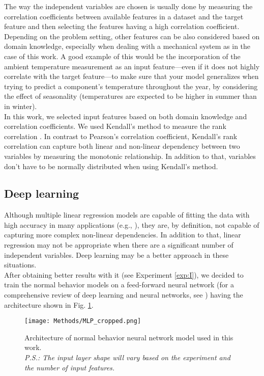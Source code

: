  \par The way the independent variables are chosen is usually done by measuring the correlation coefficients between available features in a
  dataset and the target feature and then selecting the features having a high correlation coefficient. Depending on the problem setting, other features can be also considered 
  based on domain knowledge, especially when dealing with a mechanical system as in the case of this work. A good example of this would be the incorporation of 
  the ambient temperature measurement as an input feature---even if it does not highly correlate with the target feature---to make sure that your model generalizes when 
  trying to predict a component's temperature throughout the year, by considering the effect of seasonality 
  (temperatures are expected to be higher in summer than in winter).\\
  In this work, we selected input features based on both domain knowledge and correlation coefficients. We used Kendall's method to measure the rank correlation \cite{Kendall}.
  In contrast to Pearson's correlation coefficient, Kendall's rank correlation can capture both linear and non-linear dependency between two variables by 
  measuring the monotonic relationship. In addition to that, variables don't have to be normally distributed when using Kendall's method.

\subsection{Deep learning}
  Although multiple linear regression models are capable of fitting the data with high accuracy in many applications (e.g., \cite{Linear_Regression_Example_1}), they are,
  by definition, not capable of capturing more complex non-linear dependencies. In addition to that, linear regression may not be appropriate when there are a significant 
  number of independent variables. Deep learning may be a better approach in these situations.\\
  After obtaining better results with it (see Experiment \ref{exp:I}), we decided to train the normal behavior models
  on a feed-forward neural network (for a comprehensive review of deep learning and neural networks, see \cite{Deep_Learning}) having the architecture shown 
  in Fig. \ref{fig:MLP}.

  \begin{figure}[!htbp]
    \begin{center}
      \texttt{[image: Methods/MLP\_cropped.png]}
    \end{center}
    \caption{Architecture of normal behavior neural network model used in this work. \\
    \emph{P.S.: The input layer shape will vary based on the experiment and the number of input features.}}
    \label{fig:MLP}
  \end{figure}

